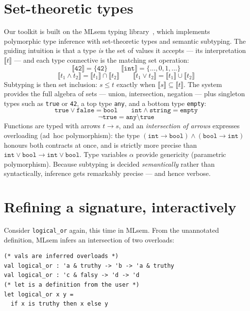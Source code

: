 \documentclass[sigplan,screen]{acmart}
\newcommand{\ttt}[1]{\texttt{#1}}
\newcommand{\interp}[1]{\llbracket #1 \rrbracket}
\begin{document}
\section{Set-theoretic types}

Our toolkit is built on the MLsem typing
library~\cite{type-inference}, which implements polymorphic type
inference with set-theoretic types and semantic subtyping.  The
guiding intuition is that a type \emph{is} the set of values it
accepts --- its interpretation $\interp{t}$ --- and each type
connective is the matching set operation:
\[
  \interp{\ttt{42}} = \{\ttt{42}\}
  \qquad
  \interp{\ttt{int}} = \{\ldots, 0, 1, \ldots\}
\]
\[
  \interp{t_1 \wedge t_2} = \interp{t_1} \cap \interp{t_2}
  \qquad
  \interp{t_1 \vee t_2} = \interp{t_1} \cup \interp{t_2}
\]
Subtyping is then set inclusion: $s \leq t$ exactly when
$\interp{s} \subseteq \interp{t}$.  The system provides the full
algebra of sets --- union, intersection, negation --- plus singleton
types such as \ttt{true} or \ttt{42}, a top type \ttt{any}, and
a bottom type \ttt{empty}:
\[
  \ttt{true} \vee \ttt{false} = \ttt{bool}
  \qquad
  \ttt{int} \wedge \ttt{string} = \ttt{empty}
\]
\[
  \neg\ttt{true} = \ttt{any} \setminus \ttt{true}
\]
Functions are typed with arrows $t \rightarrow s$, and an
\emph{intersection of arrows} expresses overloading (ad~hoc
polymorphism): the type
$(\ttt{int} \rightarrow \ttt{bool}) \wedge (\ttt{bool} \rightarrow
\ttt{int})$ honours both contracts at once, and is strictly more
precise than
$\ttt{int} \vee \ttt{bool} \rightarrow \ttt{int} \vee \ttt{bool}$.
Type variables $\alpha$ provide genericity (parametric
polymorphism).  Because subtyping is decided \emph{semantically}
rather than syntactically, inference gets remarkably precise --- and
hence verbose.

\section{Refining a signature, interactively}

Consider \ttt{logical\_or} again, this time in MLsem.  From the
unannotated definition, MLsem infers an intersection of two
overloads:

\noindent\begin{minipage}{\linewidth}
\begin{lstlisting}[language=MLsem]
(* vals are inferred overloads *)
val logical_or : 'a & truthy -> 'b -> 'a & truthy
val logical_or : 'c & falsy -> 'd -> 'd
(* let is a definition from the user *)
let logical_or x y =
  if x is truthy then x else y
\end{lstlisting}
\end{minipage}
\end{document}
